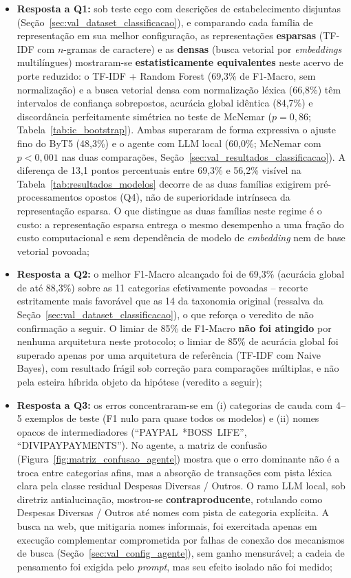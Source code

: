 \begin{itemize}
	\item \textbf{Resposta a Q1:} sob teste cego com descrições de estabelecimento disjuntas (Seção~\ref{sec:val_dataset_classificacao}), e
	comparando cada família de representação em sua melhor configuração, as representações
	\textbf{esparsas} (TF-IDF com $n$-gramas de caractere) e as \textbf{densas} (busca vetorial por
	\textit{embeddings} multilíngues) mostraram-se \textbf{estatisticamente equivalentes} neste acervo de
	porte reduzido: o TF-IDF + Random Forest (69,3\% de F1-Macro, sem normalização) e a busca vetorial
	densa com normalização léxica (66,8\%) têm intervalos de confiança sobrepostos, acurácia global
	idêntica (84,7\%) e discordância perfeitamente simétrica no teste de McNemar ($p = 0{,}86$;
	Tabela~\ref{tab:ic_bootstrap}). Ambas superaram de forma expressiva o ajuste fino do ByT5 (48,3\%) e o
	agente com LLM local (60,0\%; McNemar com $p < 0{,}001$ nas duas comparações, Seção~\ref{sec:val_resultados_classificacao}). A diferença de 13,1 pontos percentuais entre 69,3\% e 56,2\%
	visível na Tabela~\ref{tab:resultados_modelos} decorre de as duas famílias exigirem
	pré-processamentos opostos (Q4), não de superioridade intrínseca da representação esparsa. O que
	distingue as duas famílias neste regime é o custo: a representação esparsa entrega o mesmo
	desempenho a uma fração do custo computacional e sem dependência de modelo de \textit{embedding}
	nem de base vetorial povoada;

	\item \textbf{Resposta a Q2:} o melhor F1-Macro alcançado foi de
	69,3\% (acurácia global de até 88,3\%) sobre as 11
	categorias efetivamente povoadas -- recorte estritamente mais favorável que as 14 da taxonomia original (ressalva da Seção~\ref{sec:val_dataset_classificacao}), o que reforça o veredito de não confirmação a seguir. O limiar de 85\% de F1-Macro \textbf{não foi
	atingido} por nenhuma arquitetura neste protocolo; o limiar de 85\% de acurácia global foi superado apenas por uma arquitetura de referência (TF-IDF com Naive Bayes), com resultado frágil sob correção para comparações múltiplas, e não pela esteira híbrida objeto da hipótese (veredito a seguir);

	\item \textbf{Resposta a Q3:} os erros concentraram-se em (i) categorias de cauda com
	4--5 exemplos de teste (F1 nulo para quase todos os modelos) e (ii) nomes opacos de
	intermediadores (``PAYPAL~*BOSS~LIFE'', ``DIVIPAYPAYMENTS''). No agente, a matriz de confusão (Figura~\ref{fig:matriz_confusao_agente}) mostra que o erro dominante não é a troca entre categorias afins, mas a absorção de transações com pista léxica clara pela classe residual Despesas Diversas / Outros. O ramo LLM local, sob
	diretriz antialucinação, mostrou-se \textbf{contraproducente}, rotulando como
	Despesas Diversas / Outros até nomes com pista de categoria explícita. A busca na web, que mitigaria nomes informais, foi exercitada apenas em execução complementar comprometida por falhas de conexão dos mecanismos de busca (Seção~\ref{sec:val_config_agente}), sem ganho mensurável; a cadeia de pensamento foi exigida pelo \textit{prompt}, mas seu efeito isolado não foi medido;


\end{itemize}
